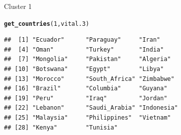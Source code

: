 \documentclass[unknownkeysallowed]{beamer}\usepackage[]{graphicx}\usepackage[]{color}
\makeatletter
\newcommand{\hlnum}[1]{\textcolor[rgb]{0.686,0.059,0.569}{#1}}%
\newcommand{\hlstd}[1]{\textcolor[rgb]{0.345,0.345,0.345}{#1}}%
\newcommand{\hlkwd}[1]{\textcolor[rgb]{0.737,0.353,0.396}{\textbf{#1}}}%
\newenvironment{kframe}{%
 \def\at@end@of@kframe{}%
 \ifinner\ifhmode%
  \def\at@end@of@kframe{\end{minipage}}%
  \begin{minipage}{\columnwidth}%
 \fi\fi%
 \def\FrameCommand##1{\hskip\@totalleftmargin \hskip-\fboxsep
 \colorbox{shadecolor}{##1}\hskip-\fboxsep
     \hskip-\linewidth \hskip-\@totalleftmargin \hskip\columnwidth}%
 \MakeFramed {\advance\hsize-\width
   \@totalleftmargin\z@ \linewidth\hsize
   \@setminipage}}%
 {\par\unskip\endMakeFramed%
 \at@end@of@kframe}
\newenvironment{knitrout}{}{} %
\makeatother
\begin{document}
\begin{frame}[fragile]{Cluster 1}

\begin{knitrout}\footnotesize
{}\color{fgcolor}\begin{kframe}
\begin{alltt}
\hlkwd{get_countries}\hlstd{(}\hlnum{1}\hlstd{,vital.3)}
\end{alltt}
\begin{verbatim}
##  [1] "Ecuador"      "Paraguay"     "Iran"        
##  [4] "Oman"         "Turkey"       "India"       
##  [7] "Mongolia"     "Pakistan"     "Algeria"     
## [10] "Botswana"     "Egypt"        "Libya"       
## [13] "Morocco"      "South_Africa" "Zimbabwe"    
## [16] "Brazil"       "Columbia"     "Guyana"      
## [19] "Peru"         "Iraq"         "Jordan"      
## [22] "Lebanon"      "Saudi_Arabia" "Indonesia"   
## [25] "Malaysia"     "Philippines"  "Vietnam"     
## [28] "Kenya"        "Tunisia"
\end{verbatim}
\end{kframe}
\end{knitrout}
\end{frame}
\end{document}
